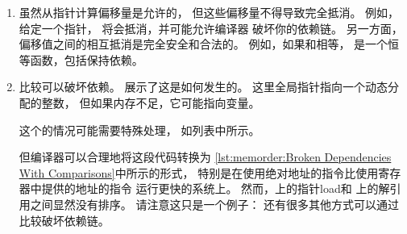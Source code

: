 \begin{enumerate}
\item	虽然从指针计算偏移量是允许的，
	但这些偏移量不得导致完全抵消。
	例如，给定一个指针，
	将会抵消，并可能允许编译器
	破坏你的依赖链。
	另一方面，偏移值之间的相互抵消是完全安全和合法的。
	例如，如果和相等，
	是一个恒等函数，包括保持依赖。
\item	比较可以破坏依赖。
	展示了这是如何发生的。
	这里全局指针指向一个动态分配的整数，
	但如果内存不足，它可能指向变量。
	\begin{fcvref}
	这个的情况可能需要特殊处理，
	如列表中所示。
	\end{fcvref}
	\begin{fcvref}
	但编译器可以合理地将这段代码转换为
	\cref{lst:memorder:Broken Dependencies With Comparisons}中所示的形式，
	特别是在使用绝对地址的指令比使用寄存器中提供的地址的指令
	运行更快的系统上。
	然而，上的指针load和
	上的解引用之间显然没有排序。
	请注意这只是一个例子：
	还有很多其他方式可以通过比较破坏依赖链。
	\end{fcvref}
\end{enumerate}

